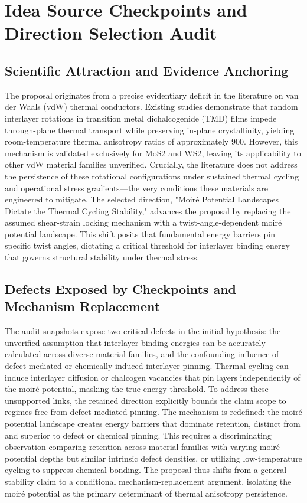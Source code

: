\documentclass[conference]{IEEEtran}
\begin{document}
\section{Idea Source Checkpoints and Direction Selection Audit}
\subsection{Scientific Attraction and Evidence Anchoring}
The proposal originates from a precise evidentiary deficit in the literature on van der Waals (vdW) thermal conductors. Existing studies demonstrate that random interlayer rotations in transition metal dichalcogenide (TMD) films impede through-plane thermal transport while preserving in-plane crystallinity, yielding room-temperature thermal anisotropy ratios of approximately 900. However, this mechanism is validated exclusively for MoS2 and WS2, leaving its applicability to other vdW material families unverified. Crucially, the literature does not address the persistence of these rotational configurations under sustained thermal cycling and operational stress gradients—the very conditions these materials are engineered to mitigate. The selected direction, "Moiré Potential Landscapes Dictate the Thermal Cycling Stability," advances the proposal by replacing the assumed shear-strain locking mechanism with a twist-angle-dependent moiré potential landscape. This shift posits that fundamental energy barriers pin specific twist angles, dictating a critical threshold for interlayer binding energy that governs structural stability under thermal stress.~\cite{cite_26ecaf73d88dfe33}

\subsection{Defects Exposed by Checkpoints and Mechanism Replacement}
The audit snapshots expose two critical defects in the initial hypothesis: the unverified assumption that interlayer binding energies can be accurately calculated across diverse material families, and the confounding influence of defect-mediated or chemically-induced interlayer pinning. Thermal cycling can induce interlayer diffusion or chalcogen vacancies that pin layers independently of the moiré potential, masking the true energy threshold. To address these unsupported links, the retained direction explicitly bounds the claim scope to regimes free from defect-mediated pinning. The mechanism is redefined: the moiré potential landscape creates energy barriers that dominate retention, distinct from and superior to defect or chemical pinning. This requires a discriminating observation comparing retention across material families with varying moiré potential depths but similar intrinsic defect densities, or utilizing low-temperature cycling to suppress chemical bonding. The proposal thus shifts from a general stability claim to a conditional mechanism-replacement argument, isolating the moiré potential as the primary determinant of thermal anisotropy persistence.
\end{document}
